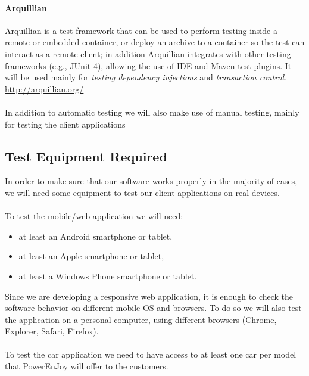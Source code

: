 \documentclass[english]{article}
\begin{document}
\paragraph{Arquillian}
Arquillian is a test framework that can be used to perform testing inside a remote or embedded container, or deploy an archive to a container so the test can interact as a remote client; in addition Arquillian integrates with other testing frameworks (e.g., JUnit 4), allowing the use of IDE and Maven test plugins.
It will be used mainly for \emph{testing dependency injections} and \emph{transaction control}.\\
\url{http://arquillian.org/}

\paragraph{}
In addition to automatic testing we will also make use of manual testing, mainly for testing the client applications 

\newpage
\subsection{Test Equipment Required}
In order to make sure that our software works properly in the majority of cases, we will need some equipment to test our client applications on real devices.

\paragraph{}
To test the mobile/web application we will need:
\begin{itemize}
\item at least an Android smartphone or tablet,
\item at least an Apple smartphone or tablet,
\item at least a Windows Phone smartphone or tablet.
\end{itemize}
Since we are developing a responsive web application, it is enough to check the software behavior on different mobile OS and browsers. To do so we will also test the application on a personal computer, using different browsers (Chrome, Explorer, Safari, Firefox).

\paragraph{}
To test the car application we need to have access to at least one car per model that PowerEnJoy will offer to the customers. 
\end{document}
